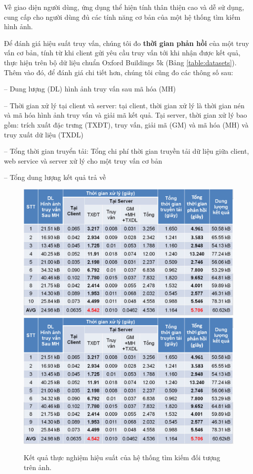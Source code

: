 {	Về giao diện người dùng, ứng dụng thể hiện tính thân thiện cao và dễ sử dụng, cung cấp cho người dùng đủ các tính năng cơ bản của một hệ thống tìm kiếm hình ảnh.
	
	Để đánh giá hiệu suất truy vấn, chúng tôi đo \textbf{thời gian phản hồi} của một truy vấn cơ bản, tính từ khi client gửi yêu cầu truy vấn tới khi nhận được kết quả, thực hiện trên bộ dữ liệu chuẩn Oxford Buildings 5k (Bảng \ref{table:datasets}). Thêm vào đó, để đánh giá chi tiết hơn, chúng tôi cũng đo các thông số sau:
	
	-- Dung lượng (DL) hình ảnh truy vấn sau mã hóa (MH)
	
	-- Thời gian xử lý tại client và server: tại client, thời gian xử lý là thời gian nén và mã hóa hình ảnh truy vấn và giải mã kết quả. Tại server, thời gian xử lý bao gồm: trích xuất đặc trưng (TXĐT), truy vấn, giải mã (GM) và mã hóa (MH) và truy xuất dữ liệu (TXDL)
	
	-- Tổng thời gian truyển tải: Tổng chi phí thời gian truyền tải dữ liệu giữa client, web service và server xử lý cho một truy vấn cơ bản
	
	-- Tổng dung lượng kết quả trả về	
	
\begin{figure}[!htbp]
  \begin{center}
    \leavevmode
    \ifpdf
      \includegraphics[scale=0.17]{app_experimental}
    \else
      \includegraphics[scale=0.17]{app_experimental}
    \fi
    \caption[Kết quả thực nghiệm hiệu suất của hệ thống tìm kiếm đối tượng trên ảnh.]{Kết quả thực nghiệm hiệu suất của hệ thống tìm kiếm đối tượng trên ảnh.}
    \label{FigAppExperimental}
  \end{center}
\end{figure}
		
}
